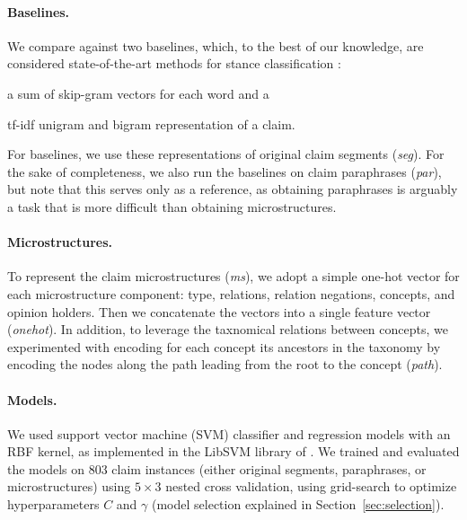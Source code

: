 \paragraph{Baselines.} 
We compare against two baselines, which, to the best of our knowledge, are
considered state-of-the-art methods for stance classification
\citep{sobhani2016detecting}: 
\begin{enumerate*}[label=(\arabic*)]
\item a sum of skip-gram vectors \citep{mikolov2013distributed} for each word
and a
\item tf-idf unigram and bigram representation of a claim.
\end{enumerate*}
For baselines, we use these representations of original claim segments
(\emph{seg}). For the sake of completeness, we also run 
the baselines on claim paraphrases (\emph{par}), but note that this serves
only as a reference, as obtaining paraphrases is arguably a task 
that is more difficult than obtaining microstructures. 

\paragraph{Microstructures.}
To represent the claim microstructures (\emph{ms}), we adopt a simple 
one-hot vector for each microstructure component: type, relations, 
relation negations, concepts, and opinion holders.
Then we concatenate the vectors into a single feature vector (\emph{onehot}). 
In addition, to leverage the taxnomical relations between concepts, 
we experimented with encoding for each concept its ancestors in the taxonomy
by encoding the nodes along the path leading from the root to the concept (\emph{path}).

\paragraph{Models. }
We used support vector machine (SVM) classifier and regression models with an
RBF kernel, as implemented in the LibSVM library of \citet{chang2011libsvm}.
We trained and evaluated the models on 803 claim instances
(either original segments, paraphrases, or microstructures) using
$5 \times 3$ nested cross validation, using grid-search to 
optimize hyperparameters $C$ and $\gamma$
(model selection explained in Section~\ref{sec:selection}).

